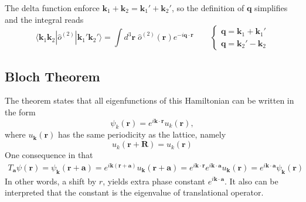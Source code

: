 \documentclass[../../../main.tex]{subfiles}
\begin{document}
The delta function enforce $\mathbf{k }_1+\mathbf{k }_2=\mathbf{k }_1'+\mathbf{k }_2'$, so the definition of $\mathbf{q}$ simplifies and the integral reads
\begin{equation*}
  \langle \mathbf{k}_1 \mathbf{k}_2 | \hat{o}^{(2)} | \mathbf{k}_1' \mathbf{k}_2' \rangle
  =
  \int d^3 \mathbf{r}\; \hat{o}^{(2)}(\mathbf{r}) e^{-i \mathbf{q} \cdot \mathbf{r}}
  \qquad
  \begin{cases}
    \mathbf{q} = \mathbf{k}_1 +\mathbf{k}_1' \\
    \mathbf{q}= \mathbf{k}_2' - \mathbf{k}_2
  \end{cases}
\end{equation*}

\subsection{Bloch Theorem}
The theorem states that all eigenfunctions of this Hamiltonian can be written in the form
\begin{equation*}
  \psi_{k}(\mathbf{r}) = e^{i \mathbf{k} \cdot \mathbf{r}} u_{k}(\mathbf{r}),
\end{equation*}
where $u_\mathbf{k}(\mathbf{r})$ has the same periodicity as the lattice, namely
\begin{equation*}
  u_{k}(\mathbf{r} + \mathbf{R}) = u_{k}(\mathbf{r})
\end{equation*}
One consequence in that
\begin{align*}
  T_\mathbf{a}\psi(\mathbf{r})
  = \psi_{\mathbf{k}}(\mathbf{r} + \mathbf{a})
  = e^{i \mathbf{k}(\mathbf{r}+\mathbf{a})}u_{\mathbf{k}}(\mathbf{r} + \mathbf{a})
  = e^{i \mathbf{k }\cdot \mathbf{r}} e^{i \mathbf{k }\cdot \mathbf{a}} u_{\mathbf{k}}(\mathbf{r})
  = e ^{i \mathbf{k }\cdot \mathbf{a}}\psi_{\mathbf{k}}(\mathbf{r})
\end{align*}
In other words, a shift by $r$, yields extra phase constant $e^{i \mathbf{k }\cdot \mathbf{a}}$.
It also can be interpreted that the constant is the eigenvalue of translational operator.
\end{document}
